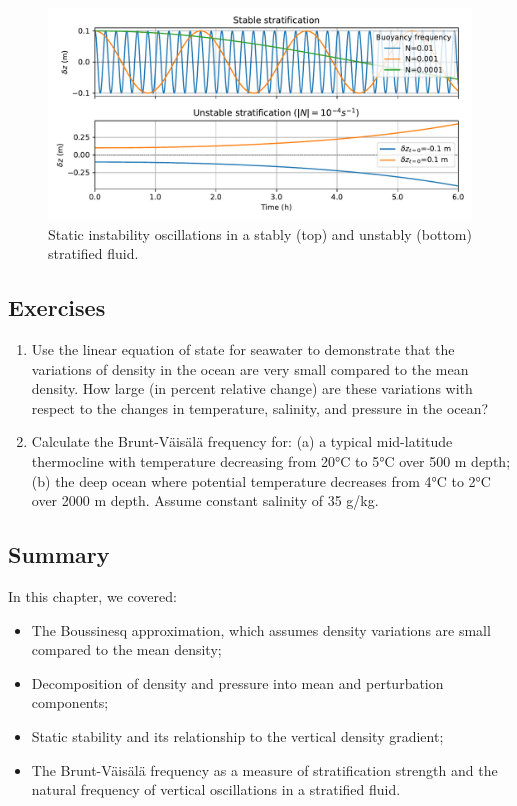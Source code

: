 \documentclass[12pt]{article}
\numberwithin{equation}{section}
\numberwithin{figure}{section}
\numberwithin{table}{section}
\begin{document}
\begin{figure}[h]
  \centering
  \includegraphics[width=\textwidth]{assets/fig_static_instability_numerical.pdf}
  \caption{
    Static instability oscillations in a stably (top) and unstably (bottom)
    stratified fluid.
  }
  \label{fig:static_instability_oscillation}
\end{figure}

\subsection*{Exercises}

\begin{enumerate}

  \item Use the linear equation of state for seawater to demonstrate that the
  variations of density in the ocean are very small compared to the mean
  density. How large (in percent relative change) are these variations with
  respect to the changes in temperature, salinity, and pressure in the ocean?

  \item Calculate the Brunt-Väisälä frequency for:
  (a) a typical mid-latitude thermocline with temperature decreasing from 20°C
  to 5°C over 500 m depth;
  (b) the deep ocean where potential temperature decreases from 4°C to 2°C
  over 2000 m depth.
  Assume constant salinity of 35 g/kg.

\end{enumerate}

\subsection*{Summary}

In this chapter, we covered:

\begin{itemize}
  \item The Boussinesq approximation, which assumes density variations are small
  compared to the mean density;
  \item Decomposition of density and pressure into mean and perturbation components;
  \item Static stability and its relationship to the vertical density gradient;
  \item The Brunt-Väisälä frequency as a measure of stratification strength and
  the natural frequency of vertical oscillations in a stratified fluid.
\end{itemize}
\end{document}
